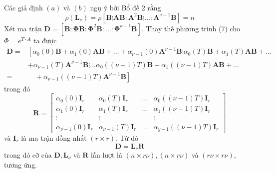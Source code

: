 \documentclass[12pt,a4paper]{article}
\begin{document}
Các giả định $(a)$ và $(b)$ ngụ ý bởi Bổ đề 2 rằng
\begin{equation}\label{pt14}\tag{14}
	\rho\left(\mathbf{L}_\nu\right)=\rho\left[\mathbf{B} \vdots \mathbf{A B}: \mathbf{A}^2 \mathbf{B} \vdots \ldots: \mathbf{A}^{\nu-1} \mathbf{B}\right]=n
\end{equation}
Xét ma trận $\mathbf{D}=\left[\mathbf{B}: \boldsymbol{\Phi} \mathbf{B}: \boldsymbol{\Phi}^2 \mathbf{B}: \ldots: \boldsymbol {\Phi}^{\nu-1} \mathbf{B}\right]$. Thay thế phương trình (7) cho $\Phi=e^{T \cdot A}$ ta được
$$
\begin{aligned}
	\mathbf{D}= & {\left[\alpha_0(0) \mathbf{B}+\alpha_1(0) \mathbf{A B}+\ldots+\alpha_{\nu-1}(0) \mathbf{A}^{\nu-1} \mathbf{B} \vdots \alpha_0(T) \mathbf{B}+\alpha_1(T) \mathbf{A B}+\ldots\right.} \\
	& +\alpha_{\nu-1}(T) \mathbf{A}^{\nu-1} \mathbf{B} \vdots \ldots \alpha_0((\nu-1) T) \mathbf{B}+\alpha_1((\nu-1) T) \mathbf{A B}+\ldots \\
	= & \left.\quad+\alpha_{\nu-1}((\nu-1) T) \mathbf{A}^{\nu-1} \mathbf{B}\right]
\end{aligned}
$$
trong đó
\begin{equation}\label{pt15}\tag{15}
	\mathbf{R}=\left[\begin{array}{cccc}
		\alpha_0(0) \mathbf{I}_r & \alpha_0(T) \mathbf{I}_r & \ldots & \alpha_0((\nu-1) T) \mathbf{I}_r \\
		\alpha_1(0) \mathbf{I}_r & \alpha_1(T) \mathbf{I}_r & \ldots & \alpha_1((\nu-1) T) \mathbf{I}_r \\
		\vdots & \vdots & & \vdots \\
		\alpha_{\nu-1}(0) \mathbf{I}_r & \alpha_{\nu-1}(T) \mathbf{I}_r & \ldots & \alpha_{y-1}((\nu-1) T) \mathbf{I}_r
	\end{array}\right]
\end{equation}
và $\mathbf{I}_r$ là ma trận đồng nhất $(r \times r)$. Từ đó
\begin{equation}\tag{16}\label{pt16}
	\mathbf{D}=\mathbf{L}_\nu \mathbf{R}
\end{equation}
trong đó cỡ của $\mathbf{D}, \mathbf{L}_\nu$ và $\mathbf{R}$ lần lượt là $(n \times r \nu),(n \times r \nu)$ và $ (r \nu \times r \nu)$, tương ứng.
\end{document}
